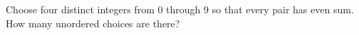 Choose four distinct integers from 0 through 9 so that every pair has even sum. How many unordered choices are there?

